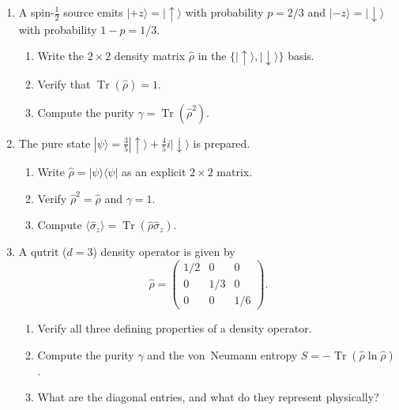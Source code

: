 \documentclass[11pt,a4paper]{article}
\begin{document}
\begin{tcolorbox}[ugprobbox, title={Part A --- Mechanics \hfill\normalfont 4 problems}]

\begin{enumerate}[leftmargin=1.8em, label=\textbf{A\arabic*.}, itemsep=12pt]

\item {}
  A spin-$\tfrac{1}{2}$ source emits $|{+}z\rangle=|\uparrow\rangle$ with probability
  $p=2/3$ and $|{-}z\rangle=|\downarrow\rangle$ with probability $1-p=1/3$.
  \begin{enumerate}[label=(\alph*)]
    \item Write the $2\times 2$ density matrix $\hat{\rho}$ in the $\{|\uparrow\rangle,|\downarrow\rangle\}$ basis.
    \item Verify that $\operatorname{Tr}(\hat{\rho})=1$.
    \item Compute the purity $\gamma=\operatorname{Tr}(\hat{\rho}^2)$.
  \end{enumerate}

\item {}
  The pure state $|\psi\rangle=\tfrac{3}{5}|\uparrow\rangle+\tfrac{4}{5}i|\downarrow\rangle$
  is prepared.
  \begin{enumerate}[label=(\alph*)]
    \item Write $\hat{\rho}=|\psi\rangle\langle\psi|$ as an explicit $2\times 2$ matrix.
    \item Verify $\hat{\rho}^2=\hat{\rho}$ and $\gamma=1$.
    \item Compute $\langle\hat{\sigma}_z\rangle=\operatorname{Tr}(\hat{\rho}\hat{\sigma}_z)$.
  \end{enumerate}

\item {}
  A qutrit ($d=3$) density operator is given by
  \[
    \hat{\rho}=\begin{pmatrix}1/2&0&0\\0&1/3&0\\0&0&1/6\end{pmatrix}.
  \]
  \begin{enumerate}[label=(\alph*)]
    \item Verify all three defining properties of a density operator.
    \item Compute the purity $\gamma$ and the von~Neumann entropy $S=-\operatorname{Tr}(\hat{\rho}\ln\hat{\rho})$.
    \item What are the diagonal entries, and what do they represent physically?
  \end{enumerate}


\end{enumerate}
\end{tcolorbox}
\end{document}
